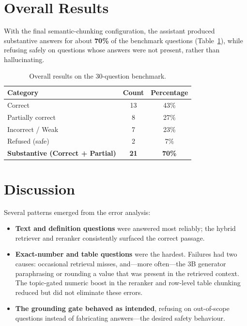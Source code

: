 \documentclass[12pt,a4paper]{report}
\begin{document}
\section{Overall Results}
With the final semantic-chunking configuration, the assistant produced substantive
answers for about \textbf{70\%} of the benchmark questions
(Table~\ref{tab:results}), while refusing safely on questions whose answers were
not present, rather than hallucinating.

\begin{table}[htbp]
\centering
\caption{Overall results on the 30-question benchmark.}
\label{tab:results}
\begin{tabular}{@{}lcc@{}}
\toprule
\textbf{Category} & \textbf{Count} & \textbf{Percentage} \\
\midrule
Correct                     & 13 & 43\% \\
Partially correct           & 8  & 27\% \\
Incorrect / Weak            & 7  & 23\% \\
Refused (safe)              & 2  & 7\%  \\
\midrule
\textbf{Substantive (Correct + Partial)} & \textbf{21} & \textbf{70\%} \\
\bottomrule
\end{tabular}
\end{table}

\section{Discussion}
Several patterns emerged from the error analysis:
\begin{itemize}[leftmargin=1.4em]
  \item \textbf{Text and definition questions} were answered most reliably; the
        hybrid retriever and reranker consistently surfaced the correct passage.
  \item \textbf{Exact-number and table questions} were the hardest. Failures had
        two causes: occasional retrieval misses, and---more often---the 3B
        generator paraphrasing or rounding a value that was present in the
        retrieved context. The topic-gated numeric boost in the reranker and
        row-level table chunking reduced but did not eliminate these errors.
  \item \textbf{The grounding gate behaved as intended}, refusing on out-of-scope
        questions instead of fabricating answers---the desired safety behaviour.
\end{itemize}
\end{document}
